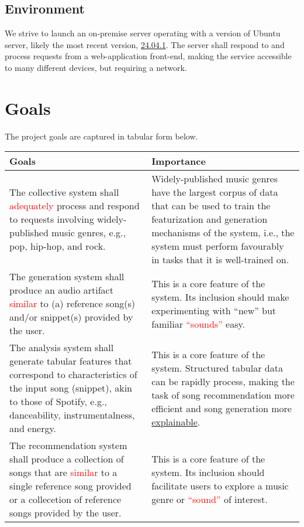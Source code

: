 \documentclass{article}
\begin{document}
\subsection{Environment}
We strive to launch an on-premise server operating with a version of Ubuntu server, likely the most recent version, \href{https://ubuntu.com/download/server}{24.04.1}. The server shall respond to and process requests from a web-application front-end, making the service accessible to many different devices, but requiring a network.

\newpage
\section{Goals}
The project goals are captured in tabular form below.
\begin{table}[h!]
    \centering
    \begin{tabular}{p{} || p{}}
        \toprule
        \textbf{Goals} & \textbf{Importance} \\
        \midrule
        The collective system shall \textcolor{red}{adequately} process and respond to requests involving widely-published music genres, e.g., pop, hip-hop, and rock. & Widely-published music genres have the largest corpus of data that can be used to train the featurization and generation mechanisms of the system, i.e., the system must perform favourably in tasks that it is well-trained on. \\
        \midrule
        The generation system shall produce an audio artifact \textcolor{red}{similar} to (a) reference song(s) and/or snippet(s) provided by the user. & This is a core feature of the system. Its inclusion should make experimenting with ``new'' but familiar \textcolor{red}{``sounds''} easy. \\
        \midrule
        The analysis system shall generate tabular features that correspond to characteristics of the input song (snippet), akin to those of Spotify, e.g., danceability, instrumentalness, and energy. & This is a core feature of the system. Structured tabular data can be rapidly process, making the task of song recommendation more efficient and song generation more \href{https://en.wikipedia.org/wiki/Explainable_artificial_intelligence}{explainable}. \\
        \midrule
        The recommendation system shall produce a collection of songs that are \textcolor{red}{similar} to a single reference song provided or a collecetion of reference songs provided by the user. & This is a core feature of the system. Its inclusion should facilitate users to explore a music genre or \textcolor{red}{``sound''} of interest. \\

\end{tabular}
\end{table}
\end{document}
